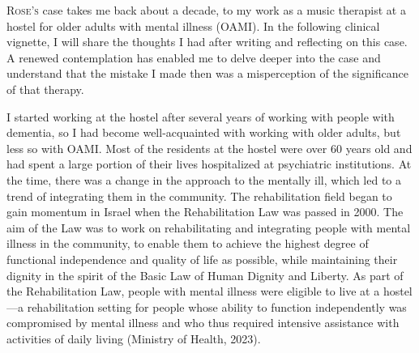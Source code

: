 \documentclass[authordate, empirical]{jote-new-article}
\author[1]{\mbox{Ayelet Dassa\orcid{0000-0001-7641-3918}}}
\affil[1]{Bar-Ilan University}
\begin{document}
\begin{frontmatter}
  \maketitle
  \begin{abstract}
    \printabstracttext
  \end{abstract}
\end{frontmatter}

\lettrine{R}{ose's} case takes me back about a decade, to my work as a music therapist at a hostel for older adults with mental illness (OAMI). In the following clinical vignette, I will share the thoughts I had after writing and reflecting on this case. A renewed contemplation has enabled me to delve deeper into the case and understand that the mistake I made then was a misperception of the significance of that therapy.

I started working at the hostel after several years of working with people with dementia, so I had become well-acquainted with working with older adults, but less so with OAMI. Most of the residents at the hostel were over 60 years old and had spent a large portion of their lives hospitalized at psychiatric institutions. At the time, there was a change in the approach to the mentally ill, which led to a trend of integrating them in the community. The rehabilitation field began to gain momentum in Israel when the Rehabilitation Law was passed in 2000. The aim of the Law was to work on rehabilitating and integrating people with mental illness in the community, to enable them to achieve the highest degree of functional independence and quality of life as possible, while maintaining their dignity in the spirit of the Basic Law of Human Dignity and Liberty. As part of the Rehabilitation Law, people with mental illness were eligible to live at a hostel—a rehabilitation setting for people whose ability to function independently was compromised by mental illness and who thus required intensive assistance with activities of daily living (Ministry of Health, 2023).
\end{document}
